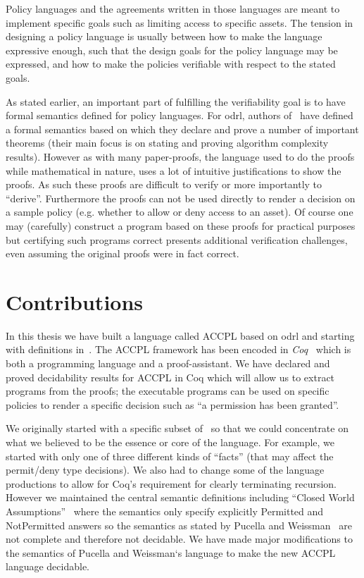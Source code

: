 Policy languages and the agreements written in those languages are meant to implement specific goals such as limiting access to specific assets. The tension in designing a policy language is usually between how to make the language expressive enough, such that the design goals for the policy language may be expressed, and how to make the policies verifiable with respect to the stated goals.

As stated earlier, an important part of fulfilling the verifiability goal is to have formal semantics defined for policy languages. For \ac{odrl}, authors of~\cite{pucella2006} have defined a formal semantics based on which they declare and prove a number of important theorems (their main focus is on stating and proving algorithm complexity results). However as with many paper-proofs, the language used to do the proofs while mathematical in nature, uses a lot of intuitive justifications to show the proofs. As such these proofs are difficult to verify or more importantly to ``derive''. Furthermore the proofs can not be used directly to render a decision on a sample policy (e.g. whether to allow or deny access to an asset). Of course one may (carefully) construct a program based on these proofs for practical purposes but certifying such programs correct presents additional verification challenges, even assuming the original proofs were in fact correct.

\section{Contributions}

In this thesis we have built a language called \ac{ACCPL} based on \ac{odrl} and starting with definitions in~\cite{pucella2006}. The \ac{ACCPL} framework has been encoded in \emph{Coq}~\cite{BC04} which is both a programming language and a proof-assistant. We have declared and proved decidability results for \ac{ACCPL} in Coq which will allow us to extract programs from the proofs; the executable programs can be used on specific policies to render a specific decision such as ``a permission has been granted''. 

We originally started with a specific subset of~\cite{pucella2006} so that we could concentrate on what we believed to be the essence or core of the language. For example, we started with only one of three different kinds of ``facts'' (that may affect the permit/deny type decisions). We also had to change some of the language productions to allow for Coq's requirement for clearly terminating recursion. However we maintained the central semantic definitions including ``Closed World Assumptions''~\cite{pucella2006} where the semantics only specify explicitly Permitted and NotPermitted answers so the semantics as stated by Pucella and Weissman~\cite{pucella2006} are not complete and therefore not decidable. We have made major modifications to the semantics of Pucella and Weissman`s language to make the new \ac{ACCPL} language decidable.
    
